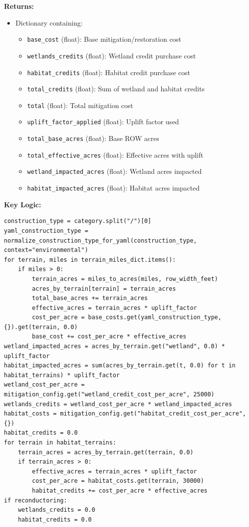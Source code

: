 \documentclass[ctcc_full_documentation.tex]{subfiles}
\begin{document}
\textbf{Returns:}
\begin{itemize}
    \item Dictionary containing:
    \begin{itemize}
        \item \texttt{base\_cost} (float): Base mitigation/restoration cost
        \item \texttt{wetlands\_credits} (float): Wetland credit purchase cost
        \item \texttt{habitat\_credits} (float): Habitat credit purchase cost
        \item \texttt{total\_credits} (float): Sum of wetland and habitat credits
        \item \texttt{total} (float): Total mitigation cost
        \item \texttt{uplift\_factor\_applied} (float): Uplift factor used
        \item \texttt{total\_base\_acres} (float): Base ROW acres
        \item \texttt{total\_effective\_acres} (float): Effective acres with uplift
        \item \texttt{wetland\_impacted\_acres} (float): Wetland acres impacted
        \item \texttt{habitat\_impacted\_acres} (float): Habitat acres impacted
    \end{itemize}
\end{itemize}

\textbf{Key Logic:}
\begin{lstlisting}
construction_type = category.split("/")[0]
yaml_construction_type = normalize_construction_type_for_yaml(construction_type, context="environmental")
for terrain, miles in terrain_miles_dict.items():
    if miles > 0:
        terrain_acres = miles_to_acres(miles, row_width_feet)
        acres_by_terrain[terrain] = terrain_acres
        total_base_acres += terrain_acres
        effective_acres = terrain_acres * uplift_factor
        cost_per_acre = base_costs.get(yaml_construction_type, {}).get(terrain, 0.0)
        base_cost += cost_per_acre * effective_acres
wetland_impacted_acres = acres_by_terrain.get("wetland", 0.0) * uplift_factor
habitat_impacted_acres = sum(acres_by_terrain.get(t, 0.0) for t in habitat_terrains) * uplift_factor
wetland_cost_per_acre = mitigation_config.get("wetland_credit_cost_per_acre", 25000)
wetlands_credits = wetland_cost_per_acre * wetland_impacted_acres
habitat_costs = mitigation_config.get("habitat_credit_cost_per_acre", {})
habitat_credits = 0.0
for terrain in habitat_terrains:
    terrain_acres = acres_by_terrain.get(terrain, 0.0)
    if terrain_acres > 0:
        effective_acres = terrain_acres * uplift_factor
        cost_per_acre = habitat_costs.get(terrain, 30000)
        habitat_credits += cost_per_acre * effective_acres
if reconductoring:
    wetlands_credits = 0.0
    habitat_credits = 0.0
\end{lstlisting}
\end{document}
